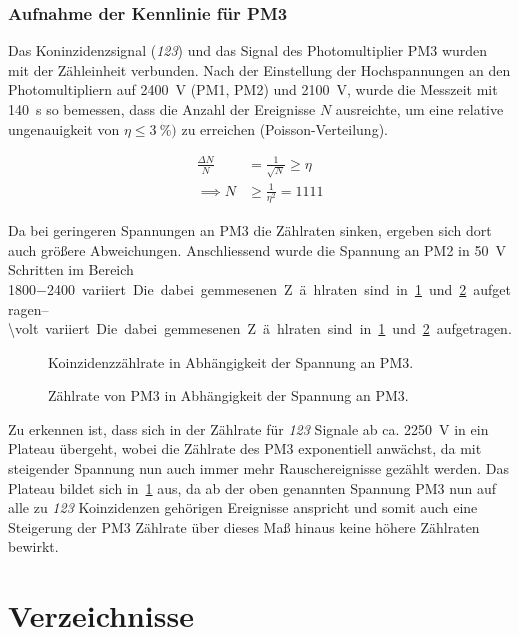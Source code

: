 \documentclass[slug=LM, room=Andreas-Schubert-Bau\,\ K\ 1A, supervisor=Anne-Sophie\ Berthold, coursedate=13.\ 12.\ 2019]{../../Lab_Report_LaTeX/lab_report}
\begin{document}
\subsubsection{Aufnahme der Kennlinie f\"ur PM3}
\label{sec:pm3kenn}

Das Koninzidenzsignal (\textit{123}) und das Signal des
Photomultiplier PM3 wurden mit der Z\"ahleinheit verbunden.  Nach der
Einstellung der Hochspannungen an den Photomultipliern auf
\SI{2400}{\volt} (PM1, PM2) und \SI{2100}{\volt}, wurde die Messzeit
mit \SI{140}{\second} so bemessen, dass die Anzahl der Ereignisse
\(N\) ausreichte, um eine relative ungenauigkeit von
\(\eta \leq \SI{3}{\percent})\) zu erreichen (Poisson-Verteilung).

\begin{align}
  \label{eq:mtime}
  \frac{\Delta N}{N} &= \frac{1}{\sqrt{N}} \geq \eta \\
  \implies N &\geq \frac{1}{\eta^2} = 1111
\end{align}

Da bei geringeren Spannungen an PM3 die Z\"ahlraten sinken, ergeben
sich dort auch gr\"o\ss{}ere Abweichungen.  Anschliessend wurde die
Spannung an PM2 in \SI{50}{\volt} Schritten im Bereich
\SIrange{1800-2400}{\volt} variiert.
Die dabei gemmesenen Z\"ahlraten
sind in~\ref{fig:vorversuch-kennlinie_123} und
\ref{fig:vorversuch-kennlinie_pm3} aufgetragen.

\begin{figure}[h]\centering
  
  \caption{Koinzidenzz\"ahlrate in Abh\"angigkeit der Spannung an PM3.}
  \label{fig:vorversuch-kennlinie_123}
\end{figure}

\begin{figure}[h]\centering
  
  \caption{Z\"ahlrate von PM3 in Abh\"angigkeit der Spannung an PM3.}
  \label{fig:vorversuch-kennlinie_pm3}
\end{figure}

Zu erkennen ist, dass sich in der Z\"ahlrate f\"ur \textit{123}
Signale ab ca. \SI{2250}{\volt} in ein Plateau \"ubergeht, wobei die
Z\"ahlrate des PM3 exponentiell anw\"achst, da mit steigender Spannung
nun auch immer mehr Rauschereignisse gez\"ahlt werden. Das Plateau
bildet sich in~\ref{fig:vorversuch-kennlinie_123} aus, da ab der oben
genannten Spannung PM3 nun auf alle zu \textit{123} Koinzidenzen
geh\"origen Ereignisse anspricht und somit auch eine Steigerung der
PM3 Z\"ahlrate \"uber dieses Ma\ss{} hinaus keine h\"ohere Z\"ahlraten
bewirkt.
\section{Verzeichnisse}

\label{sec:literatur}

\listoffigures

\listoftables

\printbibliography
\end{document}
